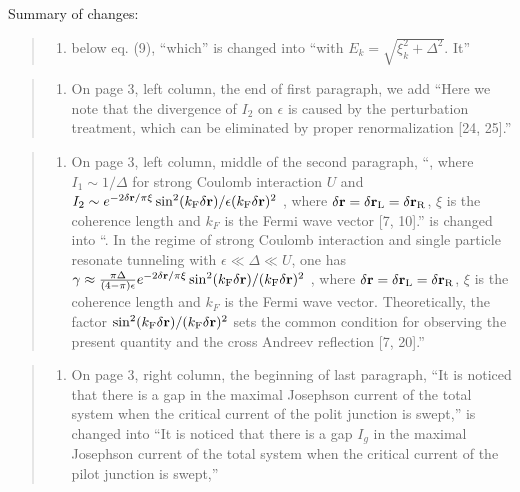 \documentclass[11pt]{article}
\providecommand{\tightlist}{%
      \setlength{\itemsep}{0pt}\setlength{\parskip}{0pt}}
\begin{document}
Summary of changes:

\begin{quote}
\begin{enumerate}
\def\labelenumi{(\arabic{enumi})}
\tightlist
\item
  below eq. (9), ``which'' is changed into ``with
  \(E_k = \sqrt{\xi_k^2 + \Delta^2}\). It''
\end{enumerate}
\end{quote}

\begin{quote}
\begin{enumerate}
\def\labelenumi{(\arabic{enumi})}
\setcounter{enumi}{1}
\tightlist
\item
  On page 3, left column, the end of first paragraph, we add ``Here we
  note that the divergence of \(I_2\) on \(\epsilon\) is caused by the
  perturbation treatment, which can be eliminated by proper
  renormalization {[}24, 25{]}.''
\end{enumerate}
\end{quote}

\begin{quote}
\begin{enumerate}
\def\labelenumi{(\arabic{enumi})}
\setcounter{enumi}{2}
\tightlist
\item
  On page 3, left column, middle of the second paragraph, ``, where
  \(I_1\sim {1}/{\Delta}\) for strong Coulomb interaction \(U\) and
  \(I_2\sim e^{- 2{\delta {\bf r}}/{\pi \xi}}\sin^2(k_{\rm F} \delta {\bf r})/\epsilon (k_{\rm F} \delta {\bf r})^2\)
  , where
  \(\delta {\bf r}=\delta {\bf r}_{\rm L}=\delta {\bf r}_{\rm R}\),
  \(\xi\) is the coherence length and \(k_F\) is the Fermi wave vector
  {[}7, 10{]}.'' is changed into ``. In the regime of strong Coulomb
  interaction and single particle resonate tunneling with
  \(\epsilon\ll\Delta\ll U\), one has
  \(\gamma \approx \frac{\pi \Delta}{(4-\pi) \epsilon } e^{- 2{\delta {\bf r}}/{\pi \xi}}\sin^2(k_{\rm F} \delta {\bf r})/ (k_{\rm F} \delta {\bf r})^2\)
  , where
  \(\delta {\bf r}=\delta {\bf r}_{\rm L}=\delta {\bf r}_{\rm R}\),
  \(\xi\) is the coherence length and \(k_F\) is the Fermi wave vector.
  Theoretically, the factor
  \(\sin^2(k_{\rm F} \delta {\bf r})/ (k_{\rm F} \delta {\bf r})^2\)
  sets the common condition for observing the present quantity and the
  cross Andreev reflection {[}7, 20{]}.''
\end{enumerate}
\end{quote}

\begin{quote}
\begin{enumerate}
\def\labelenumi{(\arabic{enumi})}
\setcounter{enumi}{3}
\tightlist
\item
  On page 3, right column, the beginning of last paragraph, ``It is
  noticed that there is a gap in the maximal Josephson current of the
  total system when the critical current of the polit junction is
  swept,'' is changed into ``It is noticed that there is a gap \(I_g\)
  in the maximal Josephson current of the total system when the critical
  current of the pilot junction is swept,''
\end{enumerate}
\end{quote}
\end{document}
